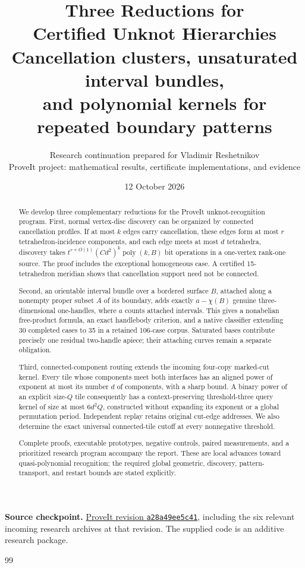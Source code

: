 \documentclass[11pt,a4paper]{article}
\title{\vspace{-1.2em}\textbf{\color{Ink}Three Reductions for\\Certified Unknot Hierarchies}\\[0.7em]
\large Cancellation clusters, unsaturated interval bundles,\\
and polynomial kernels for repeated boundary patterns}
\author{Research continuation prepared for Vladimir Reshetnikov\\
\small ProveIt project: mathematical results, certificate implementations, and evidence}
\date{12 October 2026}
\theoremstyle{definition}
\theoremstyle{remark}
\DeclareMathOperator{\poly}{poly}
\begin{document}
\maketitle
\begin{abstract}
We develop three complementary reductions for the ProveIt unknot-recognition
program. First, normal vertex-disc discovery can be organized by connected
cancellation profiles. If at most $k$ edges carry cancellation, these edges
form at most $r$ tetrahedron-incidence components, and each edge meets at most
$d$ tetrahedra, discovery takes
$t^{r+O(1)}(Cd^2)^k\poly(k,B)$ bit operations in a one-vertex rank-one source.
The proof includes the exceptional homogeneous case. A certified
15-tetrahedron meridian shows that cancellation support need not be connected.

Second, an orientable interval bundle over a bordered surface $B$, attached
along a nonempty proper subset $A$ of its boundary, adds exactly
$a-\chi(B)$ genuine three-dimensional one-handles, where $a$ counts attached
intervals. This gives a nonabelian free-product formula, an exact handlebody
criterion, and a native classifier extending 30 completed cases to 35 in a
retained 106-case corpus. Saturated bases contribute precisely one residual
two-handle apiece; their attaching curves remain a separate obligation.

Third, connected-component routing extends the incoming four-copy marked-cut
kernel. Every tile whose components meet both interfaces has an aligned power
of exponent at most its number $d$ of components, with a sharp bound. A
binary power of an explicit size-$Q$ tile consequently has a
context-preserving threshold-three query kernel of size at most $6d^2Q$,
constructed without expanding its exponent or a global permutation period.
Independent replay retains original cut-edge addresses. We also determine
the exact universal connected-tile cutoff at every nonnegative threshold.

Complete proofs, executable prototypes, negative controls, paired measurements,
and a prioritized research program accompany the report. These are local
advances toward quasi-polynomial recognition; the required global geometric,
discovery, pattern-transport, and restart bounds are stated explicitly.
\end{abstract}
\vfill
{\small\color{Ink}\textbf{Source checkpoint.}
\href{https://github.com/VladimirReshetnikov/ProveIt/tree/a28a49ee5c4145db0facbeb1e7f65cd8a2816775/Topology/UnknotRecognition}{ProveIt revision \texttt{a28a49ee5c41}},
including the six relevant incoming research archives at that revision.
The supplied code is an additive research package.}
\newpage
\tableofcontents
\newpage











\appendix

\begin{thebibliography}{99}


\end{thebibliography}
\end{document}
